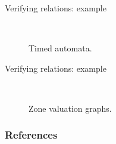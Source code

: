\documentclass{beamer}
\begin{document}
\begin{frame}[shrink=20]{Verifying relations: example}

\begin{figure}%
\centering
{}\qquad
{}\\
\caption{Timed automata.}
\label{pair03}
\end{figure}

\end{frame}

\begin{frame}[shrink=40]{Verifying relations: example}

\begin{figure}%
\centering
{}\qquad
{}\\
\caption{Zone valuation graphs.}
\label{pair03-quotients}
\end{figure}

\end{frame}

\begin{frame}[allowframebreaks]
  \frametitle{References}
  
  
\end{frame}
\end{document}
